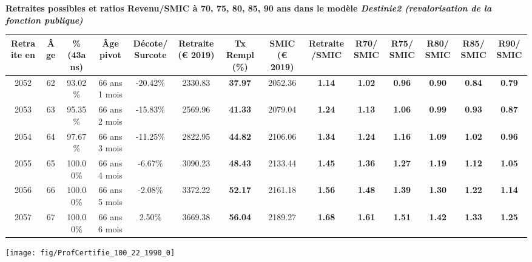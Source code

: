  \vspace{0.1cm} 
{\bf \noindent Retraites possibles et ratios Revenu/SMIC à 70, 75, 80, 85, 90 ans dans le modèle \emph{Destinie2 (revalorisation de la fonction publique)}}  
 
\begin{adjustbox}{max width=\textwidth} 
\begin{tabular}[htb]{|c|c||c|c|c||c|c||c|c||c|c|c|c|c|} 
\hline 
 Retraite en &  Âge &  \%(43ans) &  Âge pivot &  Décote/Surcote &  Retraite (\euro{} 2019) &  Tx Rempl(\%) &  SMIC (\euro{} 2019) &  Retraite/SMIC &  R70/SMIC &  R75/SMIC &  R80/SMIC &  R85/SMIC &  R90/SMIC \\ 
\hline \hline 
 2052 &  62 &  93.02\% &  66 ans 1 mois &  -20.42\% &  2330.83 &  {\bf 37.97} &  2052.36 &  {\bf 1.14} &  {\bf 1.02} &  {\bf {\color{red} 0.96}} &  {\bf {\color{red} 0.90}} &  {\bf {\color{red} 0.84}} &  {\bf {\color{red} 0.79}} \\ 
\hline 
 2053 &  63 &  95.35\% &  66 ans 2 mois &  -15.83\% &  2569.96 &  {\bf 41.33} &  2079.04 &  {\bf 1.24} &  {\bf 1.13} &  {\bf 1.06} &  {\bf {\color{red} 0.99}} &  {\bf {\color{red} 0.93}} &  {\bf {\color{red} 0.87}} \\ 
\hline 
 2054 &  64 &  97.67\% &  66 ans 3 mois &  -11.25\% &  2822.95 &  {\bf 44.82} &  2106.06 &  {\bf 1.34} &  {\bf 1.24} &  {\bf 1.16} &  {\bf 1.09} &  {\bf 1.02} &  {\bf {\color{red} 0.96}} \\ 
\hline 
 2055 &  65 &  100.00\% &  66 ans 4 mois &  -6.67\% &  3090.23 &  {\bf 48.43} &  2133.44 &  {\bf 1.45} &  {\bf 1.36} &  {\bf 1.27} &  {\bf 1.19} &  {\bf 1.12} &  {\bf 1.05} \\ 
\hline 
 2056 &  66 &  100.00\% &  66 ans 5 mois &  -2.08\% &  3372.22 &  {\bf 52.17} &  2161.18 &  {\bf 1.56} &  {\bf 1.48} &  {\bf 1.39} &  {\bf 1.30} &  {\bf 1.22} &  {\bf 1.14} \\ 
\hline 
 2057 &  67 &  100.00\% &  66 ans 6 mois &  2.50\% &  3669.38 &  {\bf 56.04} &  2189.27 &  {\bf 1.68} &  {\bf 1.61} &  {\bf 1.51} &  {\bf 1.42} &  {\bf 1.33} &  {\bf 1.25} \\ 
\hline 
\hline 
\end{tabular} 
\end{adjustbox} 
 
 \vspace{0.1cm} 

 {\hspace{-2.2cm}\texttt{[image: fig/ProfCertifie\_100\_22\_1990\_0]}} 

